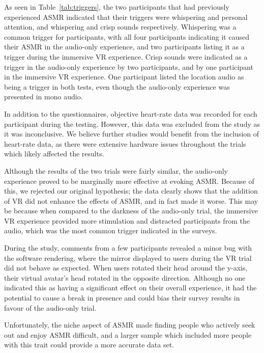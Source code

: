\documentclass{sigchi}
\begin{document}
As seen in Table~\ref{tab:triggers}, the two participants that had previously experienced ASMR indicated that their triggers were whispering and personal attention, and whispering and crisp sounds respectively. Whispering was a common trigger for participants, with all four participants indicating it caused their ASMR in the audio-only experience, and two participants listing it as a trigger during the immersive VR experience. Crisp sounds were indicated as a trigger in the audio-only experience by two participants, and by one participant in the immersive VR experience. One participant listed the location audio as being a trigger in both tests, even though the audio-only experience was presented in mono audio.

In addition to the questionnaires, objective heart-rate data was recorded for each participant during the testing. However, this data was excluded from the study as it was inconclusive. We believe further studies would benefit from the inclusion of heart-rate data, as there were extensive hardware issues throughout the trials which likely affected the results.

Although the results of the two trials were fairly similar, the audio-only experience proved to be marginally more effective at evoking ASMR. Because of this, we rejected our original hypothesis; the data clearly shows that the addition of VR did not enhance the effects of ASMR, and in fact made it worse. This may be because when compared to the darkness of the audio-only trial, the immersive VR experience provided more stimulation and distracted participants from the audio, which was the most common trigger indicated in the surveys.

During the study, comments from a few participants revealed a minor bug with the software rendering, where the mirror displayed to users during the VR trial did not behave as expected. When users rotated their head around the y-axis, their virtual avatar's head rotated in the opposite direction. Although no one indicated this as having a significant effect on their overall experience, it had the potential to cause a break in presence and could bias their survey results in favour of the audio-only trial.

Unfortunately, the niche aspect of ASMR made finding people who actively seek out and enjoy ASMR difficult, and a larger sample which included more people with this trait could provide a more accurate data set.
\end{document}
